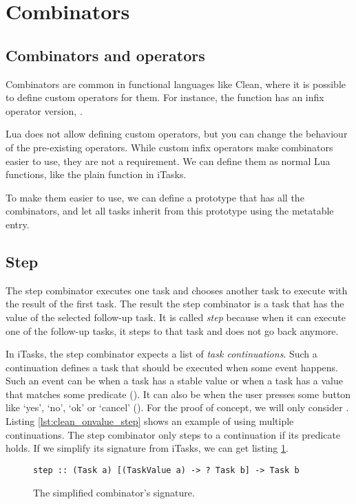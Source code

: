 \section{Combinators}\label{section-combinators}

\subsection{Combinators and operators}
Combinators are common in functional languages like Clean, where it is possible to define custom operators for them. For instance, the  function has an infix operator version, \clean{>>*}.

Lua does not allow defining custom operators, but you can change the behaviour of the pre-existing operators. While custom infix operators make combinators easier to use, they are not a requirement. We can define them as normal Lua functions, like the plain  function in iTasks.

To make them easier to use, we can define a  prototype that has all the combinators, and let all tasks inherit from this prototype using the  metatable entry.

\subsection{Step}
The step combinator executes one task and chooses another task to execute with the result of the first task. The result the step combinator is a task that has the value of the selected follow-up task. It is called \textit{step} because when it can execute one of the follow-up tasks, it steps to that task and does not go back anymore.

In iTasks, the step combinator expects a list of \textit{task continuations}. Such a continuation defines a task that should be executed when some event happens. Such an event can be when a task has a stable value or when a task has a value that matches some predicate (). It can also be when the user presses some button like `yes', `no', `ok' or `cancel' (). For the proof of concept, we will only consider . Listing \ref{lst:clean_onvalue_step} shows an example of using multiple  continuations. The step combinator only steps to a continuation if its predicate holds. If we simplify its signature from iTasks, we can get listing \ref{lst:clean_step}.

\begin{figure}[ht]
\centering
\begin{verbatim}
step :: (Task a) [(TaskValue a) -> ? Task b] -> Task b
\end{verbatim}
\caption{The simplified  combinator's signature.}
\label{lst:clean_step}
\end{figure}

